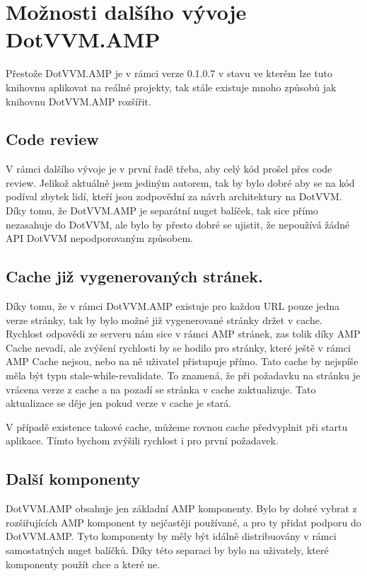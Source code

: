 \chapter{Možnosti dalšího vývoje DotVVM.AMP}
Přestože DotVVM.AMP je v rámci verze 0.1.0.7 v stavu ve kterém lze tuto knihovnu aplikovat na reálné projekty, tak stále existuje mnoho způsobů jak knihovnu DotVVM.AMP rozšířit.

\section{Code review}
V rámci dalšího vývoje je v první řadě třeba, aby celý kód prošel přes code review. Jelikož aktuálně jsem jediným autorem, tak by bylo dobré aby se na kód podíval zbytek lidí, kteří jsou zodpovědní za návrh architektury na DotVVM. Díky tomu, že DotVVM.AMP je separátní nuget balíček, tak sice přímo nezasahuje do DotVVM, ale bylo by přesto dobré se ujistit, že nepoužívá žádné API DotVVM nepodporovaným způsobem.

\section{Cache již vygenerovaných stránek.}
Díky tomu, že v rámci DotVVM.AMP existuje pro každou URL pouze jedna verze stránky, tak by bylo možné již vygenerované stránky držet v cache. Rychlost odpovědi ze serveru nám sice v rámci AMP stránek, zas tolik díky AMP Cache nevadí, ale zvýšení rychlosti by se hodilo pro stránky, které ještě v rámci AMP Cache nejsou, nebo na ně uživatel přistupuje přímo.
Tato cache by nejspíše měla být typu stale-while-revalidate. To znamená, že při požadavku na stránku je vrácena verze z cache a na pozadí se stránka v cache zaktualizuje. Tato aktualizace se děje jen pokud verze v cache je stará.

V případě existence takové cache, můžeme rovnou cache předvyplnit při startu aplikace. Tímto bychom zvýšili rychlost i pro první požadavek.

\section{Další komponenty}
DotVVM.AMP obsahuje jen základní AMP komponenty. Bylo by dobré vybrat z rozšiřujících AMP komponent ty nejčastěji používané, a pro ty přidat podporu do DotVVM.AMP. Tyto komponenty by měly být idálně distribuovány v rámci samostatných nuget balíčků. Díky této separaci by bylo na uživately, které komponenty použít chce a které ne.


